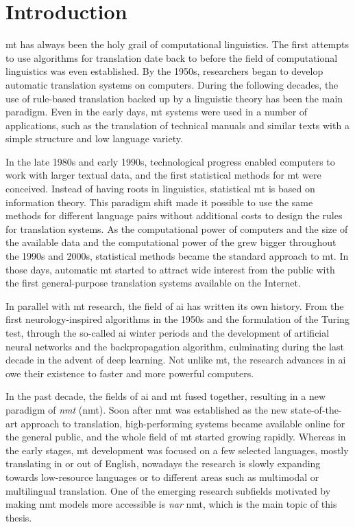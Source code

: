 \chapter{Introduction}%
\label{chap:intro}

\Ac{mt} has always been the holy grail of computational linguistics. The first
attempts to use algorithms for translation date back to before the field of
computational linguistics was even established. By the 1950s, researchers began
to develop automatic translation systems on computers. During the following
decades, the use of rule-based translation backed up by a linguistic theory has
been the main paradigm. Even in the early days, \ac{mt} systems were used in a
number of applications, such as the translation of technical manuals and
similar texts with a simple structure and low language variety.

In the late 1980s and early 1990s, technological progress enabled computers to
work with larger textual data, and the first statistical methods for \ac{mt}
were conceived. Instead of having roots in linguistics, statistical \ac{mt} is
based on information theory. This paradigm shift made it possible to use the
same methods for different language pairs without additional costs to design
the rules for translation systems. As the computational power of computers and
the size of the available data and the computational power of the grew bigger
throughout the 1990s and 2000s, statistical methods became the standard
approach to \ac{mt}. In those days, automatic \ac{mt} started to attract wide
interest from the public with the first general-purpose translation systems
available on the Internet.

In parallel with \ac{mt} research, the field of \ac{ai} has written its own
history. From the first neurology-inspired algorithms in the 1950s and the
formulation of the Turing test, through the so-called \ac{ai} winter periods
and the development of artificial neural networks and the backpropagation
algorithm, culminating during the last decade in the advent of deep learning.
Not unlike \ac{mt}, the research advances in \ac{ai} owe their existence to
faster and more powerful computers.

In the past decade, the fields of \ac{ai} and \ac{mt} fused together, resulting
in a new paradigm of \emph{\acl{nmt}} (\acs{nmt}). Soon after
\ac{nmt} was established as the new state-of-the-art approach to translation,
high-performing systems became available online for the general public, and the
whole field of \ac{mt} started growing rapidly. Whereas in the early stages,
\ac{mt} development was focused on a few selected languages, mostly translating
in or out of English, nowadays the research is slowly expanding towards
low-resource languages or to different areas such as multimodal or multilingual
translation. One of the emerging research subfields motivated by making
\ac{nmt} models more accessible is \emph{\acl{nar}} \ac{nmt}, which is the main
topic of this thesis.


